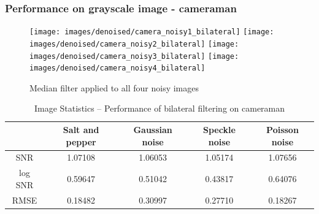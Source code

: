\documentclass{article}
\begin{document}
\subsubsection{Performance on grayscale image - cameraman}
\begin{figure}[H]
  \centering
  \texttt{[image: images/denoised/camera\_noisy1\_bilateral]}
  \texttt{[image: images/denoised/camera\_noisy2\_bilateral]}
  \texttt{[image: images/denoised/camera\_noisy3\_bilateral]}
  \texttt{[image: images/denoised/camera\_noisy4\_bilateral]}
  \caption{Median filter applied to all four noisy images }
\end{figure}
%
\begin{table}[H]
  \centering
  \begin{tabular}{c | c | c | c | c}
    & Salt and pepper & Gaussian noise & Speckle noise & Poisson noise \\
    \hline
    SNR & 1.07108 & 1.06053 & 1.05174 & 1.07656 \\
    log SNR & 0.59647 & 0.51042 & 0.43817 & 0.64076 \\
    RMSE & 0.18482 & 0.30997 & 0.27710 & 0.18267 \\
  \end{tabular}
  \caption{Image Statistics -- Performance of bilateral filtering on cameraman}
  \label{table:}
\end{table}
\newpage
\printbibliography
\end{document}
